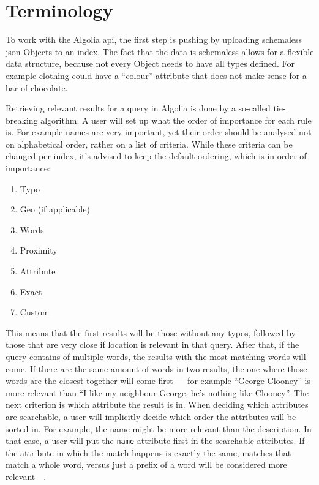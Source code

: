 
\section{Terminology}
\label{sec:terminology}

To work with the Algolia \acrshort{api}, the first step is pushing by uploading schemaless \acrshort{json} Objects to an \gls{index}. The fact that the data is schemaless allows for a flexible data structure, because not every Object needs to have all types defined. For example clothing could have a ``colour'' attribute that does not make sense for a bar of chocolate.

Retrieving relevant results for a query in Algolia is done by a so-called tie-breaking algorithm. A user will set up what the order of importance for each rule is. For example names are very important, yet their order should be analysed not on alphabetical order, rather on a list of criteria. While these criteria can be changed per \gls{index}, it's advised to keep the default ordering, which is in order of importance:

\begin{enumerate}
  \item Typo
  \item Geo (if applicable)
  \item Words
  \item Proximity
  \item Attribute
  \item Exact
  \item Custom
\end{enumerate}

This means that the first results will be those without any typos, followed by those that are very close if location is relevant in that query. After that, if the query contains of multiple words, the results with the most matching words will come. If there are the same amount of words in two results, the one where those words are the closest together will come first --- for example ``George Clooney'' is more relevant than ``I like my neighbour George, he's nothing like Clooney''. The next criterion is which attribute the result is in. When deciding which attributes are searchable, a user will implicitly decide which order the attributes will be sorted in. For example, the name might be more relevant than the description. In that case, a user will put the {\tt name} attribute first in the searchable attributes. If the attribute in which the match happens is exactly the same, matches that match a whole word, versus just a prefix of a word will be considered more relevant~\cite{algolia-relevance}~.

